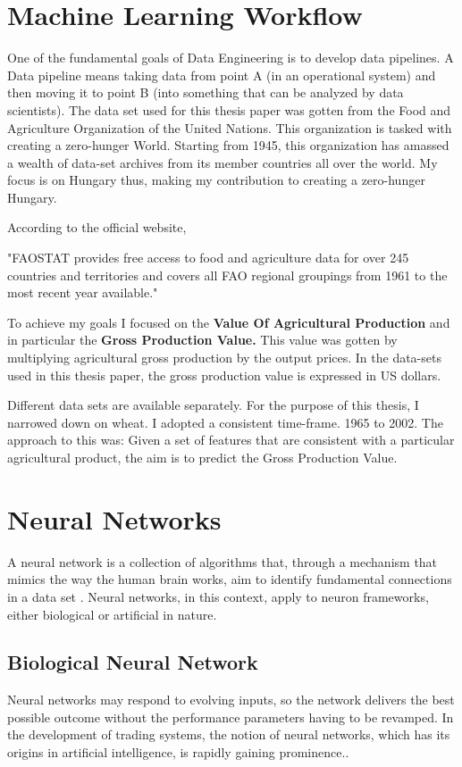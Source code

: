 \section{Machine Learning Workflow}
One of the fundamental goals of Data Engineering is to develop data pipelines. A Data pipeline means taking data from point A (in an operational system) and then moving it to point B (into something that can be analyzed by data scientists).
The data set used for this thesis paper was gotten from the Food and Agriculture Organization of the United Nations. This organization is tasked with creating a zero-hunger World. Starting from 1945, this organization has amassed a wealth of data-set archives from its member countries all over the world. My focus is on Hungary thus, making my contribution to creating a zero-hunger Hungary.

According to the official website,\cite{division_2000}
\begin{displayquote}
	"FAOSTAT provides free access to food and agriculture data for over 245 countries and territories and covers all FAO regional groupings from 1961 to the most recent year available."
\end{displayquote} 

To achieve my goals I focused on the \textbf{Value Of Agricultural Production} and in particular the \textbf{Gross Production Value.} This value was gotten by multiplying agricultural gross production by the output prices. In the data-sets used in this thesis paper, the gross production value is expressed in US dollars. 



Different data sets are available separately. For the purpose of this thesis, I narrowed down on wheat. I adopted a consistent time-frame. 1965 to 2002. The approach to this was: Given a set of features that are consistent with a particular agricultural product, the aim is to predict the Gross Production Value.

\section{Neural Networks}
A neural network is a collection of algorithms that, through a mechanism that mimics the way the human brain works, aim to identify fundamental connections in a data set \cite{jain1999recurrent}.  Neural networks, in this context, apply to neuron frameworks, either biological or artificial in nature. 

\subsection{Biological Neural Network}
Neural networks may respond to evolving inputs, so the network delivers the best possible outcome without the performance parameters having to be revamped. In the development of trading systems, the notion of neural networks, which has its origins in artificial intelligence, is rapidly gaining prominence.\citealp*{krose1993introduction}.


